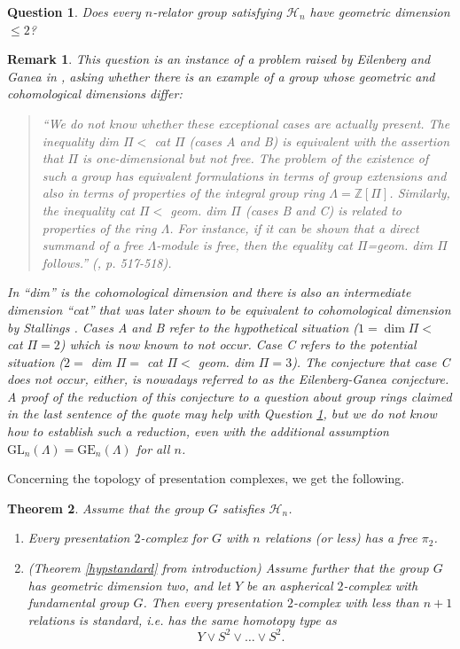\documentclass[11pt,letterpaper]{amsart}
\newtheorem{theorem}{Theorem}
\newtheorem{question}[theorem]{Question}
\newtheorem*{remark}{Remark}
\begin{document}
\begin{question}
\label{hypeg}
Does every $n$-relator group satisfying $\mathcal{H}_{n}$ have geometric dimension $\leq 2$? %
\end{question}
\begin{remark}
This question is an instance of a problem raised by Eilenberg and Ganea in \cite{eilenbergganea}, asking whether there is an example of a group whose geometric and cohomological dimensions differ: %

\begin{quote}
``{\it We do not know whether these exceptional cases are actually present. The inequality dim $\Pi<$ cat $\Pi$ (cases A and B) is equivalent with the assertion that $\Pi$ is one-dimensional but not free. The problem of the existence of such a group has equivalent formulations in terms of group extensions and also in terms of properties of the integral group ring $\Lambda=\mathbb Z[\Pi]$. Similarly, the inequality cat $\Pi<$ geom. dim $ \Pi$ (cases B and C) is related to properties of the ring $\Lambda$. For instance, if it can be shown that a direct summand of a free $\Lambda$-module is free, then the equality cat $\Pi$=geom. dim $\Pi$ follows.}'' (\cite{eilenbergganea}, p. 517-518).
\end{quote}
In \cite{eilenbergganea} ``dim'' is the cohomological dimension and there is also an intermediate dimension ``cat'' that was later shown to be equivalent to  cohomological dimension by Stallings \cite{stallings}. Cases A and B refer to the hypothetical situation ($1=\dim \Pi<$ cat $\Pi=2$) which is now known to not occur. Case C refers to the potential situation ($2=$ dim $\Pi=$ cat $\Pi<$ geom. dim $\Pi=3$). The conjecture that case C does not occur, either, is nowadays referred to as the Eilenberg-Ganea conjecture. A proof of the reduction of this conjecture to a question about group rings claimed in the last sentence of the quote may help with Question \ref{hypeg}, but we do not know how to establish such a reduction, even with the additional assumption $\mathrm{GL}_n(\Lambda)=\mathrm{GE}_n(\Lambda)$ for all $n$.
\end{remark}



Concerning the topology of presentation complexes, we get the following.

\begin{theorem}
Assume that the group $G$ satisfies $\mathcal{H}_{n}$.
\begin{enumerate}
\item[1.] 
Every presentation $2$-complex for $G$ with $n$ relations (or less) has a free $\pi_2$.
\item[2.](Theorem \ref{hypstandard} from introduction)
Assume further that the group $G$ has geometric dimension two, and let $Y$ be an aspherical $2$-complex with fundamental group $G$. Then every presentation $2$-complex with less than $n+1$ relations is standard, i.e. has the same homotopy type as $$Y \vee S^2 \vee \ldots \vee S^2.$$ 
\end{enumerate}
\end{theorem}
\end{document}
